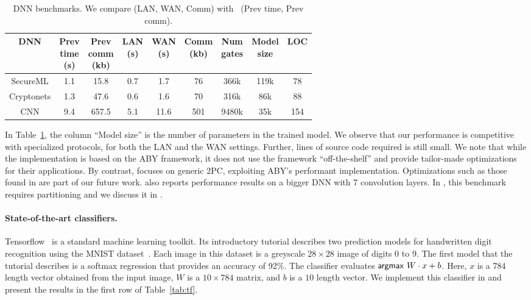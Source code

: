 \setlength\tabcolsep{2.5pt}
\begin{table}
\footnotesize
\begin{tabular}{|c|c|c|c |c|c|c|c|c|}
\hline
DNN  & \thead{Prev \\ time\\ (s)} & \thead{Prev \\ comm\\ (kb)} & \thead{LAN  \\ (s)} & \thead{WAN\\ (s)} & \thead{Comm \\(kb)} & \thead{Num \\ gates} & \thead{Model\\ size} & LOC\\
\hline
SecureML   &  1.1 & 15.8 & 0.7 & 1.7  & 76   &   366k   & 119k & 78\\
\hline
Cryptonets &  1.3 & 47.6 & 0.6 & 1.6  & 70    &  316k & 86k & 88\\
\hline
CNN        &  9.4 & 657.5& 5.1 & 11.6 & 501  & 9480k & 35k & 154\\
\hline
\end{tabular}

 \caption{DNN benchmarks. We compare \tool (LAN, WAN, Comm)
 with~\cite{minionn} (Prev time, Prev comm).}
 \label{tab:nn} 
\end{table}


In Table~\ref{tab:nn}, 
the column ``Model size'' is the number of parameters in the
trained model.
We observe that our performance is competitive with specialized
\minion protocols, for both the LAN and the WAN settings. Further, lines
of \tool source code required is still small. 
We note that while the \minion implementation is based on the ABY framework, it does not use the framework ``off-the-shelf'' and provide tailor-made optimizations for their applications. By contrast, \tool focuses on generic
2PC, exploiting ABY's performant implementation. Optimizations such as those found in \minion are part of our future work.
\minion also reports performance results on a bigger DNN with 7
convolution layers. In \tool, this benchmark requires partitioning and
we discuss it in .
\vspace{-0.18in}
\paragraph{State-of-the-art classifiers.}
Tensorflow~\cite{tensorflow} is a standard machine learning toolkit.
Its introductory tutorial describes two prediction models for handwritten digit recognition
using the MNIST dataset~\cite{mnist}.
Each image in this dataset is a greyscale $28\times 28$ image of
digits 0 to 9.
The first model that the tutorial describes is a softmax regression
that provides an accuracy of 92\%. The classifier evaluates
$ \mathsf{argmax}\ W\cdot x+b$.
Here, $x$ is a 784 length vector obtained from the input image,
 $W$ is a $10\times 784$ matrix, and  $b$ is a $10$ length
vector.
We implement this classifier in \tool and present the results in the
first row of Table~\ref{tab:tf}. 


